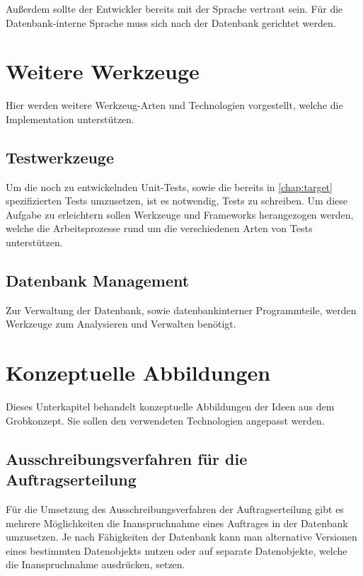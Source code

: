 Außerdem sollte der Entwickler bereits mit der Sprache vertraut sein.
Für die Datenbank-interne Sprache muss sich nach der Datenbank gerichtet werden.


\section{Weitere Werkzeuge}

Hier werden weitere Werkzeug-Arten und Technologien vorgestellt,
welche die Implementation unterstützen.

\subsection{Testwerkzeuge}

Um die noch zu entwickelnden Unit-Tests,
sowie die bereits in \cref{chap:target} spezifizierten Tests umzusetzen,
ist es notwendig, Tests zu schreiben. Um diese Aufgabe zu erleichtern
sollen Werkzeuge und Frameworks herangezogen werden,
welche die Arbeitsprozesse rund um die verschiedenen Arten von Tests unterstützen.

\subsection{Datenbank Management}

Zur Verwaltung der Datenbank, sowie datenbankinterner Programmteile,
werden Werkzeuge zum Analysieren und Verwalten benötigt.


\section{Konzeptuelle Abbildungen}

Dieses Unterkapitel behandelt konzeptuelle Abbildungen der Ideen aus dem Grobkonzept.
Sie sollen den verwendeten Technologien angepasst werden.

\subsection{Ausschreibungsverfahren für die Auftragserteilung}
\label{sec:verfahren:erteilung}

Für die Umsetzung des Ausschreibungsverfahren der Auftragserteilung gibt es
mehrere Möglichkeiten die Inanspruchnahme eines Auftrages in
der Datenbank umzusetzen. Je nach Fähigkeiten der Datenbank kann man 
alternative Versionen eines bestimmten Datenobjekts nutzen
oder auf separate Datenobjekte, welche die Inanspruchnahme ausdrücken, setzen.

